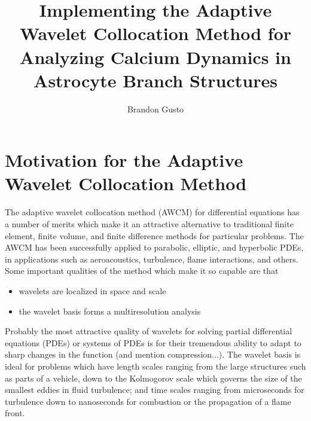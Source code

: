 \documentclass[11pt]{article}
\begin{document}
\title{Implementing the Adaptive Wavelet Collocation Method for Analyzing Calcium Dynamics 
in Astrocyte Branch Structures}
\author{Brandon Gusto \\}

\maketitle
%
\section{Motivation for the Adaptive Wavelet Collocation Method}
The adaptive wavelet collocation method (AWCM) for differential equations has a number of merits which make it an 
attractive alternative to traditional finite element, finite volume, and finite difference methods for particular problems. The 
AWCM has been successfully applied to parabolic, elliptic, and hyperbolic PDEs, in applications
such as aeroacoustics, turbulence, flame interactions, and others. 
Some important qualities of the method which make it so capable are that
\begin{itemize}
    \item wavelets are localized in space and scale
    \item the wavelet basis forms a multiresolution analysis
\end{itemize} 
Probably the most attractive quality of wavelets for solving partial differential equations (PDEs) or systems of PDEs is for their
tremendous ability to adapt to sharp changes in the function (and mention compression...). 
The wavelet basis is ideal for problems which have 
 length scales ranging from the large structures such as parts of a vehicle, down to the Kolmogorov scale which governs 
 the size of the smallest eddies in fluid turbulence; and time scales ranging from microseconds for turbulence down 
 to nanoseconds for combustion or the propagation of a flame front.
\end{document}

